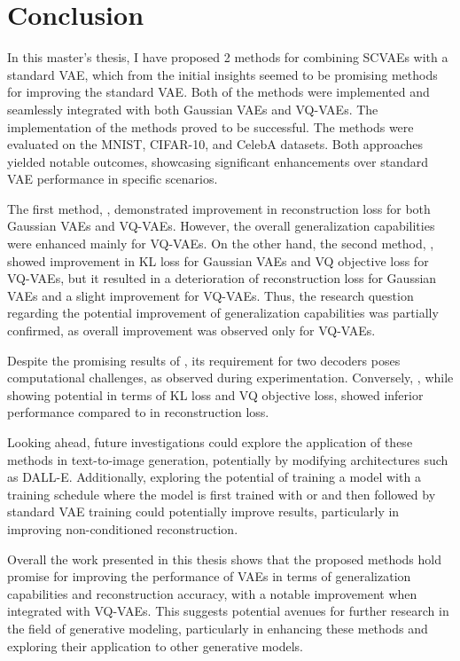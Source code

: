 \chapter{Conclusion}

In this master's thesis, I have proposed 2 methods for combining SCVAEs with a standard VAE, which from the initial insights seemed to be promising methods for improving the standard VAE. Both of the methods were implemented and seamlessly integrated with both Gaussian VAEs and VQ-VAEs. The implementation of the methods proved to be successful. The methods were evaluated on the MNIST, CIFAR-10, and CelebA datasets. Both approaches yielded notable outcomes, showcasing significant enhancements over standard VAE performance in specific scenarios.


The first method, , demonstrated improvement in reconstruction loss for both Gaussian VAEs and VQ-VAEs. However, the overall generalization capabilities were enhanced mainly for VQ-VAEs. On the other hand, the second method, , showed improvement in KL loss for Gaussian VAEs and VQ objective loss for VQ-VAEs, but it resulted in a deterioration of reconstruction loss for Gaussian VAEs and a slight improvement for VQ-VAEs. Thus, the research question regarding the potential improvement of generalization capabilities was partially confirmed, as overall improvement was observed only for VQ-VAEs.

Despite the promising results of , its requirement for two decoders poses computational challenges, as observed during experimentation. Conversely, , while showing potential in terms of KL loss and VQ objective loss, showed inferior performance compared to  in reconstruction loss.


Looking ahead, future investigations could explore the application of these methods in text-to-image generation, potentially by modifying architectures such as DALL-E. Additionally,
exploring the potential of training a model with a training schedule where the model is first trained with  or  and then followed by standard VAE training could potentially improve results, particularly in improving non-conditioned reconstruction.

Overall the work presented in this thesis shows that the proposed methods hold promise for improving the performance of VAEs in terms of generalization capabilities and reconstruction accuracy, with a notable improvement when integrated with VQ-VAEs. This suggests potential avenues for further research in the field of generative modeling, particularly in enhancing these methods and exploring their application to other generative models.


